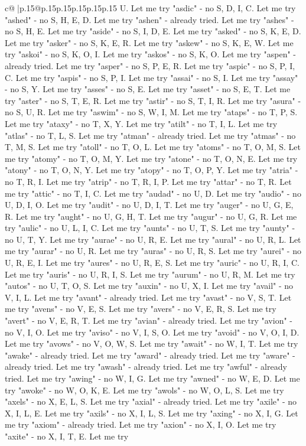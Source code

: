 \documentclass{article}
\begin{document}
{\begin{supertabular}{c@{$\;$}|p{.15\linewidth}@{}p{.15\linewidth}p{.15\linewidth}p{.15\linewidth}p{.15\linewidth}p{.15\linewidth}}
{{{U. Let me try "asdic" {-} no S, D, I, C. Let me try "ashed" {-} no S, H, E, D. Let me try "ashen" {-} already tried. Let me try "ashes" {-} no S, H, E. Let me try "aside" {-} no S, I, D, E. Let me try "asked" {-} no S, K, E, D. Let me try "asker" {-} no S, K, E, R. Let me try "askew" {-} no S, K, E, W. Let me try "askoi" {-} no S, K, O, I. Let me try "askos" {-} no S, K, O. Let me try "aspen" {-} already tried. Let me try "asper" {-} no S, P, E, R. Let me try "aspic" {-} no S, P, I, C. Let me try "aspis" {-} no S, P, I. Let me try "assai" {-} no S, I. Let me try "assay" {-} no S, Y. Let me try "asses" {-} no S, E. Let me try "asset" {-} no S, E, T. Let me try "aster" {-} no S, T, E, R. Let me try "astir" {-} no S, T, I, R. Let me try "asura" {-} no S, U, R. Let me try "aswim" {-} no S, W, I, M. Let me try "ataps" {-} no T, P, S. Let me try "ataxy" {-} no T, X, Y. Let me try "atilt" {-} no T, I, L. Let me try "atlas" {-} no T, L, S. Let me try "atman" {-} already tried. Let me try "atmas" {-} no T, M, S. Let me try "atoll" {-} no T, O, L. Let me try "atoms" {-} no T, O, M, S. Let me try "atomy" {-} no T, O, M, Y. Let me try "atone" {-} no T, O, N, E. Let me try "atony" {-} no T, O, N, Y. Let me try "atopy" {-} no T, O, P, Y. Let me try "atria" {-} no T, R, I. Let me try "atrip" {-} no T, R, I, P. Let me try "attar" {-} no T, R. Let me try "attic" {-} no T, I, C. Let me try "audad" {-} no U, D. Let me try "audio" {-} no U, D, I, O. Let me try "audit" {-} no U, D, I, T. Let me try "auger" {-} no U, G, E, R. Let me try "aught" {-} no U, G, H, T. Let me try "augur" {-} no U, G, R. Let me try "aulic" {-} no U, L, I, C. Let me try "aunts" {-} no U, T, S. Let me try "aunty" {-} no U, T, Y. Let me try "aurae" {-} no U, R, E. Let me try "aural" {-} no U, R, L. Let me try "aurar" {-} no U, R. Let me try "auras" {-} no U, R, S. Let me try "aurei" {-} no U, R, E, I. Let me try "aures" {-} no U, R, E, S. Let me try "auric" {-} no U, R, I, C. Let me try "auris" {-} no U, R, I, S. Let me try "aurum" {-} no U, R, M. Let me try "autos" {-} no U, T, O, S. Let me try "auxin" {-} no U, X, I. Let me try "avail" {-} no V, I, L. Let me try "avant" {-} already tried. Let me try "avast" {-} no V, S, T. Let me try "avens" {-} no V, E, S. Let me try "avers" {-} no V, E, R, S. Let me try "avert" {-} no V, E, R, T. Let me try "avian" {-} already tried. Let me try "avion" {-} no V, I, O. Let me try "aviso" {-} no V, I, S, O. Let me try "avoid" {-} no V, O, I, D. Let me try "avows" {-} no V, O, W, S. Let me try "await" {-} no W, I, T. Let me try "awake" {-} already tried. Let me try "award" {-} already tried. Let me try "aware" {-} already tried. Let me try "awash" {-} already tried. Let me try "awful" {-} already tried. Let me try "awing" {-} no W, I, G. Let me try "awned" {-} no W, E, D. Let me try "awoke" {-} no W, O, K, E. Let me try "awols" {-} no W, O, L, S. Let me try "axels" {-} no X, E, L, S. Let me try "axial" {-} already tried. Let me try "axile" {-} no X, I, L, E. Let me try "axils" {-} no X, I, L, S. Let me try "axing" {-} no X, I, G. Let me try "axiom" {-} already tried. Let me try "axion" {-} no X, I, O. Let me try "axite" {-} no X, I, T, E. Let me try }}}
\end{supertabular}}
\end{document}
